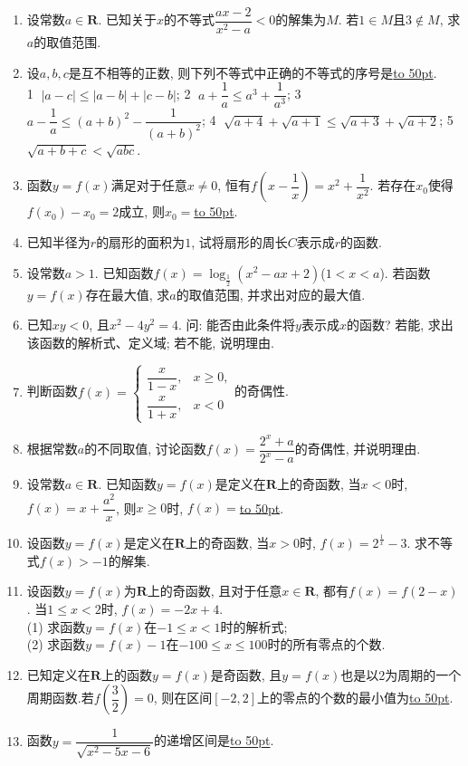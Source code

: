 \documentclass[10pt,a4paper]{article}
\newcommand{\blank}[1]{\underline{\hbox to #1pt{}}}
\begin{document}
\begin{enumerate}[1.]
\item 设常数$a\in \mathbf{R}$. 已知关于$x$的不等式$\dfrac{ax-2}{x^2-a}<0$的解集为$M$. 若$1\in M$且$3\notin M$, 求$a$的取值范围.
\item 设$a,b,c$是互不相等的正数, 则下列不等式中正确的不等式的序号是\blank{50}.\\
\textcircled{1} $|a-c|\le |a-b|+|c-b|$; \textcircled{2} $a+\dfrac 1a\le a^3+\dfrac 1{a^3}$; \textcircled{3} $a-\dfrac 1a\le (a+b)^2-\dfrac 1{(a+b)^2}$; \textcircled{4} $\sqrt {a+4}+\sqrt {a+1}\le \sqrt {a+3}+\sqrt {a+2}$; \textcircled{5} $\sqrt {a+b+c}<\sqrt {abc}$.

\item 函数$y=f(x)$满足对于任意$x\ne 0$, 恒有$f(x-\dfrac 1x)=x^2+\dfrac 1{x^2}$. 若存在$x_0$使得$f(x_0)-x_0=2$成立, 则$x_0=$\blank{50}.
\item 已知半径为$r$的扇形的面积为$1$, 试将扇形的周长$C$表示成$r$的函数.
\item 设常数$a>1$. 已知函数$f(x)=\log_{\frac 12}(x^2-ax+2)$($1<x<a$). 若函数$y=f(x)$存在最大值, 求$a$的取值范围, 并求出对应的最大值.
\item 已知$xy<0$, 且$x^2-4y^2=4$. 问: 能否由此条件将$y$表示成$x$的函数? 若能, 求出该函数的解析式、定义域; 若不能, 说明理由.
\item 判断函数$f(x)=\begin{cases} \dfrac x{1-x}, &x\ge 0, \\ \dfrac x{1+x}, & x<0  \end{cases}$的奇偶性.
\item 根据常数$a$的不同取值, 讨论函数$f(x)=\dfrac{2^x+a}{2^x-a}$的奇偶性, 并说明理由.
\item 设常数$a\in \mathbf{R}$. 已知函数$y=f(x)$是定义在$\mathbf{R}$上的奇函数, 当$x<0$时, $f(x)=x+\dfrac{a^2}x$, 则$x\ge 0$时, $f(x)=$\blank{50}.
\item 设函数$y=f(x)$是定义在$\mathbf{R}$上的奇函数, 当$x>0$时, $f(x)=2^{\frac 1x}-3$. 求不等式$f(x)>-1$的解集.
\item 设函数$y=f(x)$为$\mathbf{R}$上的奇函数, 且对于任意$x\in \mathbf{R}$, 都有$f(x)=f(2-x)$. 当$1\le x<2$时, $f(x)=-2x+4$.\\
(1) 求函数$y=f(x)$在$-1\le x<1$时的解析式;\\
(2) 求函数$y=f(x)-1$在$-100\le x\le 100$时的所有零点的个数.
\item 已知定义在$\mathbf{R}$上的函数$y=f(x)$是奇函数, 且$y=f(x)$也是以2为周期的一个周期函数.若$f(\dfrac 32)=0$, 则在区间$[-2,2]$上的零点的个数的最小值为\blank{50}.
\item 函数$y=\dfrac 1{\sqrt {x^2-5x-6}}$的递增区间是\blank{50}.

\end{enumerate}
\end{document}

